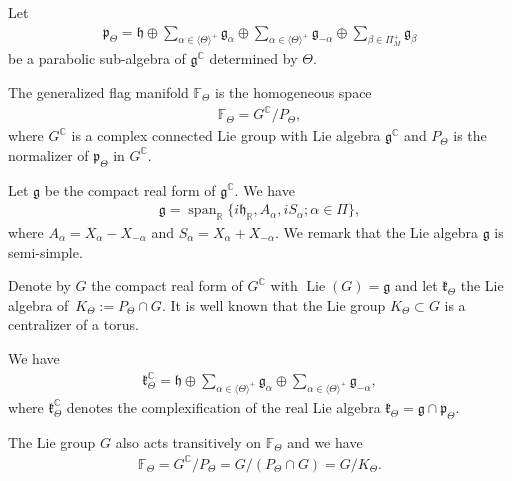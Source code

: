 \documentclass[pdftex]{sigma}%
\numberwithin{equation}{section}
\DeclareMathOperator{\Span}{span}
\DeclareMathOperator{\Lie}{Lie}
\begin{document}
Let
\begin{gather*}
\mathfrak{p}_{\Theta}=\mathfrak{h}\oplus
\sum_{\alpha\in\langle\Theta\rangle^{+}}\mathfrak{g}_{\alpha}\oplus
\sum_{\alpha\in\langle\Theta\rangle^{+}}\mathfrak{g}_{-\alpha}\oplus
\sum_{\beta\in \Pi_{M}^{+}}\mathfrak{g}_{\beta}
\end{gather*}
be a parabolic sub-algebra of $\mathfrak{g}^\mathbb{C}$ determined by $\Theta$.

The generalized flag manifold $\mathbb{F}_{\Theta}$ is the homogeneous space
\begin{gather*}
\mathbb{F}_{\Theta}=G^\mathbb{C}/P_{\Theta},
\end{gather*}
where $G^\mathbb{C}$ is a complex connected Lie group with Lie algebra $\mathfrak{g}^\mathbb{C}$ and $P_{\Theta}$ is the normalizer of $\mathfrak{p}_{\Theta}$ in $G^\mathbb{C}$.

Let $\mathfrak{g}$ be the compact real form of $\mathfrak{g}^\mathbb{C}$. %
We have
\begin{gather*}
\mathfrak{g}=\Span_{\mathbb{R}}\{i\mathfrak{h}_{\mathbb{R}},A_{\alpha},iS_{\alpha}; \alpha\in \Pi\},
\end{gather*}
where $A_{\alpha}=X_{\alpha}-X_{-\alpha}$ and $S_{\alpha}=X_{\alpha}+X_{-\alpha}$. We remark that the Lie algebra $\mathfrak{g}$ is semi-simple.

Denote by $G$ the compact real form of $G^\mathbb{C}$ with $\Lie(G)=\mathfrak{g}$ and let $\mathfrak{k}_{\Theta}$ the Lie algebra of~$K_{\Theta}:=P_{\Theta}\cap G$. It is well known that the Lie group $K_{\Theta}\subset G$ is a centralizer of a torus.

We have
\begin{gather*}
\mathfrak{k}_{\Theta}^{\mathbb{C}}=\mathfrak{h}\oplus
\sum_{\alpha\in\langle\Theta\rangle^{+}}\mathfrak{g}_{\alpha}\oplus
\sum_{\alpha\in\langle\Theta\rangle^{+}}\mathfrak{g}_{-\alpha},
\end{gather*}
where $\mathfrak{k}_{\Theta}^{\mathbb{C}}$ denotes the complexification of the real Lie algebra $\mathfrak{k}_{\Theta}=\mathfrak{g}\cap \mathfrak{p}_{\Theta}$.

The Lie group $G$ also acts transitively on $\mathbb{F}_{\Theta}$ and we have
\begin{gather*}
\mathbb{F}_{\Theta}=G^\mathbb{C}/P_{\Theta}=G/(P_{\Theta}\cap G)=G/K_{\Theta}.
\end{gather*}
\end{document}
